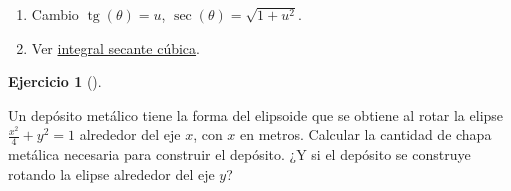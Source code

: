 \documentclass[
  spanish,
  a4paper,
]{scrreport}
\providecommand{\tightlist}{%
  \setlength{\itemsep}{0pt}\setlength{\parskip}{0pt}}
\theoremstyle{definition}
\newtheorem{exercise}{Ejercicio}[chapter]
\theoremstyle{remark}
\begin{document}
\begin{tcolorbox}
\begin{enumerate}
  \begin{enumerate}
  \def\labelenumii{(\arabic{enumii})}
  \tightlist
  \item
    Cambio \(\operatorname{tg}(\theta)=u\),
    \(\sec(\theta)=\sqrt{1+u^2}\).\\
  \item
    Ver
    \href{https://es.wikipedia.org/wiki/Integral_de_la_secante_c\%C3\%BAbica}{integral
    secante cúbica}.
  \end{enumerate}
\end{enumerate}

\end{tcolorbox}

\begin{exercise}[]\protect\hypertarget{exr-superficie-deposito}{}\label{exr-superficie-deposito}

Un depósito metálico tiene la forma del elipsoide que se obtiene al
rotar la elipse \(\frac{x^2}{4}+y^2=1\) alrededor del eje \(x\), con
\(x\) en metros. Calcular la cantidad de chapa metálica necesaria para
construir el depósito. ¿Y si el depósito se construye rotando la elipse
alrededor del eje \(y\)?

\end{exercise}
\end{document}
